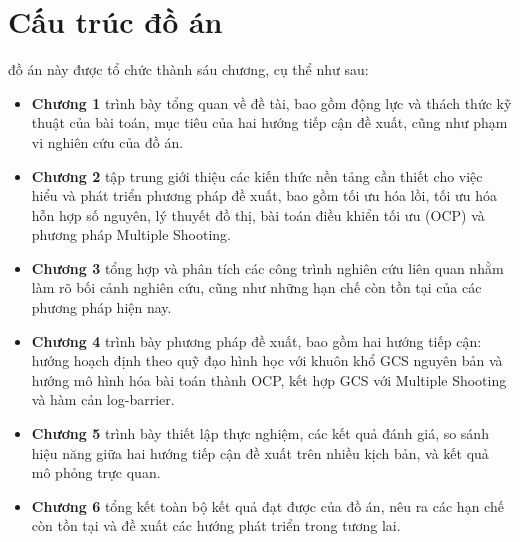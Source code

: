 \section{Cấu trúc đồ án}

đồ án này được tổ chức thành sáu chương, cụ thể như sau:

\begin{itemize}
\item \textbf{Chương 1} trình bày tổng quan về đề tài, bao gồm động lực và thách thức kỹ thuật của bài toán, mục tiêu của hai hướng tiếp cận đề xuất, cũng như phạm vi nghiên cứu của đồ án.
\item \textbf{Chương 2} tập trung giới thiệu các kiến thức nền tảng cần thiết cho việc hiểu và phát triển phương pháp đề xuất, bao gồm tối ưu hóa lồi, tối ưu hóa hỗn hợp số nguyên, lý thuyết đồ thị, bài toán điều khiển tối ưu (OCP) và phương pháp Multiple Shooting.
\item \textbf{Chương 3} tổng hợp và phân tích các công trình nghiên cứu liên quan nhằm làm rõ bối cảnh nghiên cứu, cũng như những hạn chế còn tồn tại của các phương pháp hiện nay.
\item \textbf{Chương 4} trình bày phương pháp đề xuất, bao gồm hai hướng tiếp cận: hướng hoạch định theo quỹ đạo hình học với khuôn khổ GCS nguyên bản và hướng mô hình hóa bài toán thành OCP, kết hợp GCS với Multiple Shooting và hàm cản log-barrier.
\item \textbf{Chương 5} trình bày thiết lập thực nghiệm, các kết quả đánh giá, so sánh hiệu năng giữa hai hướng tiếp cận đề xuất trên nhiều kịch bản, và kết quả mô phỏng trực quan.
\item \textbf{Chương 6} tổng kết toàn bộ kết quả đạt được của đồ án, nêu ra các hạn chế còn tồn tại và đề xuất các hướng phát triển trong tương lai.
\end{itemize}